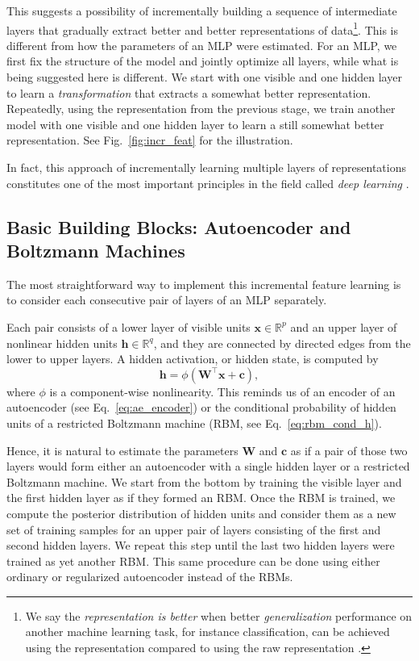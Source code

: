 \documentclass[dissertation,nocontribution,draft*]{aaltoseries}
\newcommand{\vect}[1]{\mathbf{#1}}
\newcommand{\matr}[1]{\mathbf{#1}}
\newcommand{\vc}[0]{\vect{c}}
\newcommand{\vh}[0]{\vect{h}}
\newcommand{\vx}[0]{\vect{x}}
\newcommand{\mW}[0]{\matr{W}}
\newcommand{\RR}[0]{\mathbb{R}}
\begin{document}
This suggests a possibility of incrementally building a
sequence of intermediate layers that gradually extract
better and better representations of data\footnote{We say
the \textit{representation is better} when better
\textit{generalization} performance on another machine
learning task, for instance classification, can be achieved
using the representation compared to using the raw
representation \citep{Bengio2007nips}.}. This is different
from
how the parameters of an MLP were estimated. For an MLP, we
first fix the structure of the model and jointly optimize
all layers, while what is being suggested here is different. We start with one visible and one hidden
layer to learn a \textit{transformation} that extracts a
somewhat better representation. Repeatedly, using the
representation from the previous stage, we train another
model with one visible and one hidden layer to learn a
still somewhat
better representation. See Fig.~\ref{fig:incr_feat}
for the illustration.

In fact, this approach of incrementally learning multiple
layers of representations constitutes one of the most important
principles in the field called \textit{deep learning}
\citep[see, e.g.,][]{Bengio2009a}.

\subsection{Basic Building Blocks: Autoencoder and Boltzmann
Machines}
\label{sec:basic_blocks1}

The most straightforward way to implement this incremental
feature learning is to consider each consecutive pair of
layers of an MLP separately. 

Each pair consists of a lower layer of visible units $\vx
\in \RR^p$ and an upper layer of nonlinear hidden units $\vh
\in \RR^q$, and they are connected by directed edges from
the lower to upper layers. A hidden activation, or hidden
state, is computed by 
\[
\vh = \phi\left( \mW^\top \vx + \vc \right),
\]
where $\phi$ is a component-wise nonlinearity.  This reminds
us of an encoder of an autoencoder (see
Eq.~\eqref{eq:ae_encoder}) or the conditional probability of
hidden units of a restricted Boltzmann machine (RBM, see
Eq.~\eqref{eq:rbm_cond_h}).

Hence, it is natural to estimate the parameters $\mW$ and
$\vc$ as if a pair of those two layers would form either an
autoencoder with a single hidden layer or a restricted
Boltzmann machine. We start from the bottom by training the
visible layer and the first hidden layer as if they formed
an RBM. Once the RBM is trained, we compute the posterior
distribution of hidden units and consider them as a new set
of training samples for an upper pair of layers consisting
of the first and second hidden layers. We repeat this step
until the last two hidden layers were trained as yet
another RBM. This same procedure can be done using
either ordinary or regularized autoencoder instead of the
RBMs.
\end{document}
